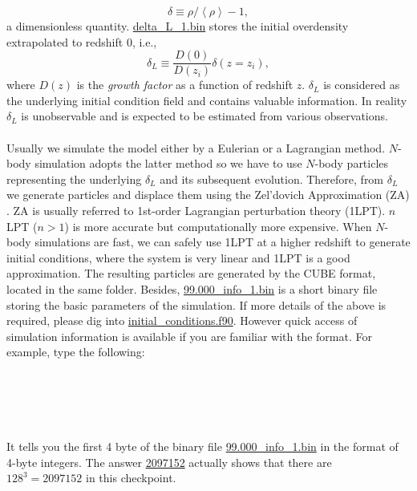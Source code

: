 \documentclass[12pt]{article}
\begin{document}
\begin{equation}
	\delta\equiv\rho/\left\langle\rho\right\rangle-1,
\end{equation}
a dimensionless quantity. \url{delta_L_1.bin} stores the initial overdensity extrapolated to redshift 0, i.e.,
\begin{equation}
	\delta_L\equiv \frac{D(0)}{D(z_i)} \delta(z=z_i),
\end{equation}
where $D(z)$ is the {\it growth factor} as a function of redshift $z$. $\delta_L$ is considered as the underlying initial condition field and contains valuable information. In reality $\delta_L$ is unobservable and is expected to be estimated from various observations.
\\\\
Usually we simulate the model either by a Eulerian or a Lagrangian method. $N$-body simulation adopts the latter method so we have to use $N$-body particles representing the underlying $\delta_L$ and its subsequent evolution. Therefore, from $\delta_L$ we generate particles and displace them using the Zel'dovich Approximation (ZA) \cite{1970A&A.....5...84Z}. ZA is usually referred to 1st-order Lagrangian perturbation theory (1LPT). $n$LPT ($n>1$) is more accurate but computationally more expensive. When $N$-body simulations are fast, we can safely use 1LPT at a higher redshift to generate initial conditions, where the system is very linear and 1LPT is a good approximation. The resulting particles are generated by the CUBE format, located in the same folder. Besides, \url{99.000_info_1.bin} is a short binary file storing the basic parameters of the simulation. If more details of the above is required, please dig into \url{initial_conditions.f90}. However quick access of simulation information is available if you are familiar with the format. For example, type the following:
\\\\
\\
\\
\\
\\
It tells you the first 4 byte of the binary file \url{99.000_info_1.bin} in the format of 4-byte integers. The answer \url{2097152} actually shows that there are $128^3=2097152$ in this checkpoint.
\end{document}
